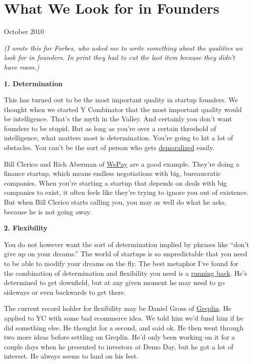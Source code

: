 \chapter{What We Look for in Founders}

October 2010

\emph{(I wrote this for Forbes, who asked me to write something about
the qualities we look for in founders. In print they had to cut the last
item because they didn't have room.)}

\textbf{1. Determination}

This has turned out to be the most important quality in startup
founders. We thought when we started Y Combinator that the most
important quality would be intelligence. That's the myth in the Valley.
And certainly you don't want founders to be stupid. But as long as
you're over a certain threshold of intelligence, what matters most is
determination. You're going to hit a lot of obstacles. You can't be the
sort of person who gets \href{die.html}{demoralized} easily.

Bill Clerico and Rich Aberman of \href{http://wepay.com}{WePay} are a
good example. They're doing a finance startup, which means endless
negotiations with big, bureaucratic companies. When you're starting a
startup that depends on deals with big companies to exist, it often
feels like they're trying to ignore you out of existence. But when Bill
Clerico starts calling you, you may as well do what he asks, because he
is not going away.

\textbf{2. Flexibility}

You do not however want the sort of determination implied by phrases
like ``don't give up on your dreams.'' The world of startups is so
unpredictable that you need to be able to modify your dreams on the fly.
The best metaphor I've found for the combination of determination and
flexibility you need is a \href{relres.html}{running back}. He's
determined to get downfield, but at any given moment he may need to go
sideways or even backwards to get there.

The current record holder for flexibility may be Daniel Gross of
\href{http://greplin.com}{Greplin}. He applied to YC with some bad
ecommerce idea. We told him we'd fund him if he did something else. He
thought for a second, and said ok. He then went through two more ideas
before settling on Greplin. He'd only been working on it for a couple
days when he presented to investors at Demo Day, but he got a lot of
interest. He always seems to land on his feet.

